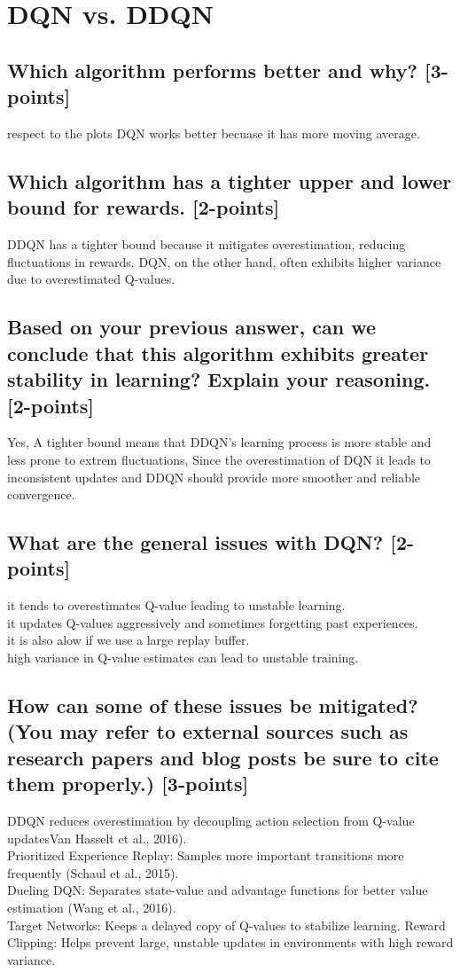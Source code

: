 \documentclass[12pt]{article}
\begin{document}
{{{				\section{DQN vs. DDQN}
				
				\subsection{Which algorithm performs better and why? [3-points]}
				respect to the plots DQN works better becuase it has more moving average.
				\subsection{Which algorithm has a tighter upper and lower bound for rewards. [2-points]}
				DDQN has a tighter bound because it mitigates overestimation, reducing fluctuations in rewards. DQN, on the other hand, often exhibits higher variance due to overestimated Q-values.
				\subsection{Based on your previous answer, can we conclude that this algorithm exhibits greater stability in
					learning? Explain your reasoning.
					[2-points]}
				Yes, A tighter bound means that DDQN's learning process is more stable and less prone to extrem fluctuations, Since the overestimation of DQN it leads to inconsistent updates and DDQN should provide more smoother and reliable convergence.
				\subsection{What are the general issues with DQN?
					[2-points]}
				it tends to overestimates Q-value leading to unstable learning.\\
				it updates Q-values aggressively and sometimes forgetting past experiences.\\
				it is also alow if we use a large replay buffer.\\
				high variance in Q-value estimates can lead to unstable training.
				
				\subsection{How can some of these issues be mitigated? (You may refer to external sources such as research
					papers and blog posts be sure to cite them properly.)
					[3-points]}
				DDQN reduces overestimation by decoupling action selection from Q-value updatesVan Hasselt et al., 2016).\\
				Prioritized Experience Replay: Samples more important transitions more frequently (Schaul et al., 2015).\\
				Dueling DQN: Separates state-value and advantage functions for better value estimation (Wang et al., 2016).\\
				Target Networks: Keeps a delayed copy of Q-values to stabilize learning.
				Reward Clipping: Helps prevent large, unstable updates in environments with high reward variance.\\
				
}}}
\end{document}
